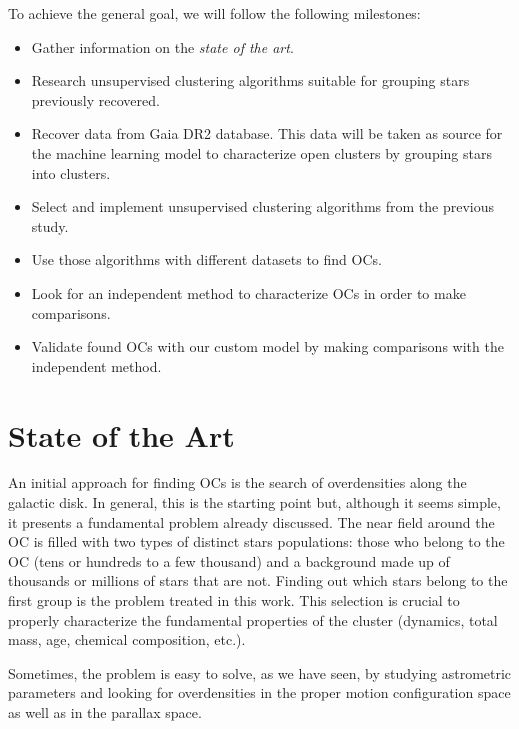 \documentclass[11pt, a4paper, english]{book}
\begin{document}
To achieve the general goal, we will follow the following milestones:

\begin{itemize}
  \item Gather information on the \emph{state of the art}.
  \item Research unsupervised clustering algorithms suitable for grouping stars previously recovered.
  \item Recover data from Gaia DR2 database. This data will be taken as source for the machine learning model to characterize open clusters
  by grouping stars into clusters.
  \item Select and implement unsupervised clustering algorithms from the previous study.
  \item Use those algorithms with different datasets to find OCs.
  \item Look for an independent method to characterize OCs in order to make comparisons.
  \item Validate found OCs with our custom model by making comparisons with the independent method.
\end{itemize}

\chapter{State of the Art}

An initial approach for finding OCs is the search of overdensities along the galactic disk. In general, this is the starting point but,
although it seems simple, it presents a fundamental problem already discussed. The near field around the OC is filled with two types of
distinct stars populations: those who belong to the OC (tens or hundreds to a few thousand) and a background made up of thousands or
millions of stars that are not. Finding out which stars belong to the first group is the problem treated in this work.
This selection is crucial to properly characterize the fundamental properties of the cluster
(dynamics, total mass, age, chemical composition, etc.).

Sometimes, the problem is easy to solve, as we have seen, by studying astrometric parameters and looking for overdensities in the proper
motion configuration space as well as in the parallax space.
\end{document}
